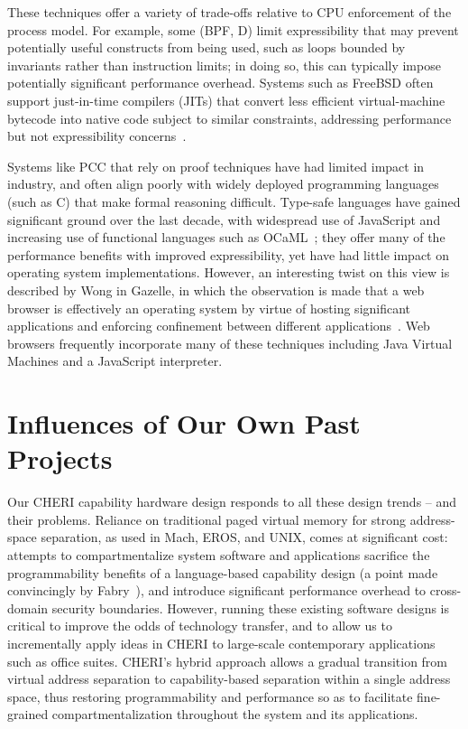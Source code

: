 These techniques offer a variety of trade-offs relative to CPU enforcement 
of the process model.  For example, some (BPF, D) limit expressibility that 
may prevent potentially useful constructs from being used, such as loops
bounded by invariants rather than instruction limits; in doing so, 
this can typically impose potentially significant performance overhead. 
Systems such as FreeBSD often support just-in-time compilers (JITs) that 
convert less efficient virtual-machine bytecode into native code subject to 
similar constraints, addressing performance but not expressibility 
concerns~\cite{mckusick:freebsd}.

Systems like PCC that rely on proof techniques have had limited impact in
industry, and often align poorly with widely deployed programming languages (such as C)
that make formal reasoning difficult.
Type-safe languages have gained significant ground over the last decade, with widespread use
of JavaScript and increasing use of functional languages such as OCaML~\cite{remy:ocaml}; they offer
many of the performance benefits with improved expressibility, yet have had little impact on
operating system implementations.
However, an interesting twist on this view is described by Wong in Gazelle, in
which the observation is made that a web browser is effectively an operating system by virtue of
hosting significant applications and enforcing confinement between different
applications~\cite{wang:gazelle}.
Web browsers frequently incorporate many of these techniques including Java Virtual Machines and
a JavaScript interpreter.

\section{Influences of Our Own Past Projects} %

Our CHERI capability hardware design responds to all these design trends -- and their problems.
Reliance on traditional paged virtual memory for strong address-space separation, as used in Mach,
EROS, and UNIX, comes at significant cost: attempts to compartmentalize system software and
applications sacrifice the programmability benefits of a language-based capability design (a point made
convincingly by Fabry~\cite{fabry:caseforcapabilities}), and introduce significant performance
overhead to cross-domain security boundaries.
However, running these existing software designs is critical to improve the odds of technology
transfer, and to allow us to incrementally apply ideas in CHERI to large-scale contemporary applications
such as office suites.
CHERI's hybrid approach allows a gradual transition from virtual address separation to capability-based
separation within a single address space, 
thus 
restoring programmability and performance so as to facilitate
fine-grained compartmentalization throughout the system and its applications.

